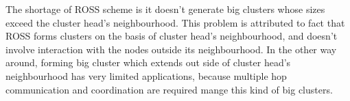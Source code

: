 \documentclass[10pt,journal,compsoc]{IEEEtran}
\theoremstyle{mytheoremstyle}
\theoremstyle{mytheoremstyle}
\theoremstyle{mytheoremstyle}
\begin{document}
The shortage of ROSS scheme is it doesn't generate big clusters whose sizes exceed the cluster head's neighbourhood.
This problem is attributed to fact that ROSS forms clusters on the basis of cluster head's neighbourhood, and doesn't involve interaction with the nodes outside its neighbourhood.
In the other way around, forming big cluster which extends out side of cluster head's neighbourhood has very limited applications, because multiple hop communication and coordination are required mange this kind of big clusters.









%


\appendices
\end{document}
